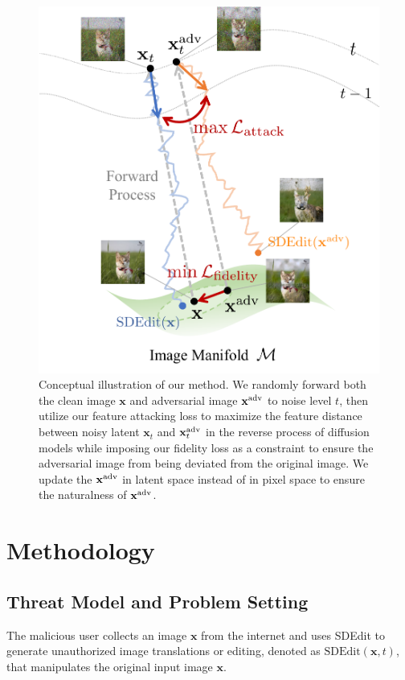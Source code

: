 \begin{figure}[t]
    \centering
    \includegraphics[width=1\linewidth]{figures/manifold.pdf}
    \caption{Conceptual illustration of our method. We randomly forward both the clean image $\mathbf{x}$ and adversarial image $\mathbf{x}^{\adv}$ to noise level $t$, then utilize our feature attacking loss to maximize the feature distance between noisy latent $\mathbf{x}_t$ and $\mathbf{x}^{\adv}_t$ in the reverse process of diffusion models while imposing our fidelity loss as a constraint to ensure the adversarial image from being deviated from the original image. We update the $\mathbf{x}^{\adv}$ in latent space instead of in pixel space to ensure the naturalness of $\mathbf{x}^{\adv}$.}
    \label{concept}
\end{figure}


\section{Methodology}

\subsection{Threat Model and Problem Setting}
The malicious user collects an image $\mathbf{x}$ from the internet and uses SDEdit \cite{meng2021sdedit} to generate unauthorized image translations or editing, denoted as $\text{SDEdit}(\mathbf{x}, t)$, that manipulates the original input image $\mathbf{x}$.

